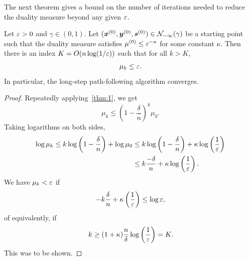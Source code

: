 The next theorem gives a bound on the number of iterations needed to reduce the duality measure beyond any given $\varepsilon$.

\begin{theorem}
 Let $\varepsilon>0$ and $\gamma\in (0,1)$. Let $(\bm{x}^{(0)},\bm{y}^{(0)},\bm{s}^{(0)})\in \mathcal{N}_{-\infty}(\gamma)$ be a starting point such that the duality measure satisfies $\mu^{(0)}\leq \varepsilon^{-\kappa}$ for some constant $\kappa$. Then there is an index $K=O(n\log (1/\varepsilon))$ such that for all $k>K$,
 \begin{equation*}
  \mu_k \leq \varepsilon.
 \end{equation*}
In particular, the long-step path-following algorithm converges.
\end{theorem}

\begin{proof}
Repeatedly applying~\eqref{thm:1}, we get
\begin{equation*}
 \mu_{k} \leq \left(1-\frac{\delta}{n}\right)^k \mu_0.
\end{equation*}
Taking logarithms on both sides,
 \begin{align*}
  \log \mu_{k}\leq k \log\left(1-\frac{\delta}{n}\right)+\log \mu_0 
  &\leq k \log\left(1-\frac{\delta}{n}\right)+\kappa \log\left(\frac{1}{\varepsilon}\right)\\
  &\leq k\frac{-\delta}{n}+\kappa\log\left(\frac{1}{\varepsilon}\right).
 \end{align*}
We have $\mu_k<\varepsilon$ if 
\begin{equation*}
 -k\frac{\delta}{n}+\kappa \left(\frac{1}{\varepsilon}\right) \leq \log \varepsilon,
\end{equation*}
of equivalently, if 
\begin{equation*}
 k\geq (1+\kappa)\frac{n}{\delta}\log\left(\frac{1}{\varepsilon}\right)=K.
\end{equation*}
This was to be shown.

\end{proof}



